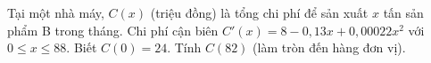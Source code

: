 \begin{ex}%
Tại một nhà máy, $C(x)$ (triệu đồng) là tổng chi phí để sản xuất $x$ tấn sản phẩm B trong tháng.
Chi phí cận biên $C'(x)=8-0{,}13x+0{,}00022x^2$ với $0\le x\le 88$. Biết $C(0)=24$.
Tính $C(82)$ (làm tròn đến hàng đơn vị).
\end{ex}

